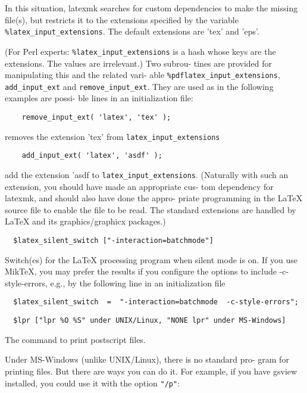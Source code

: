 In this situation, latexmk searches for custom  dependencies  to
make  the  missing  file(s),  but restricts it to the extensions
specified by the variable \verb|%latex_input_extensions|.  The  default
extensions are 'tex' and 'eps'.

(For  Perl experts: \verb|%latex_input_extensions| is a hash whose keys
are the extensions.  The values are  irrelevant.)   Two  subrou-
tines  are  provided for manipulating this and the related vari-
able \verb|%pdflatex_input_extensions|,  \verb|add_input_ext|  
and  \verb|remove_input_ext|.   They are used as in the following examples are possi-
ble lines in an initialization file:

\begin{verbatim}
	remove_input_ext( 'latex', 'tex' );
\end{verbatim}

removes the extension 'tex' from \verb|latex_input_extensions|

\begin{verbatim}
	add_input_ext( 'latex', 'asdf' );
\end{verbatim}

add the extension 'asdf to  \verb|latex_input_extensions|.   (Naturally
with such an extension, you should have made an appropriate cus-
tom dependency for latexmk, and should also have done the appro-
priate  programming  in the LaTeX source file to enable the file
to be read.  The standard extensions are handled  by  LaTeX  and
its graphics/graphicx packages.)

\begin{verbatim}
  $latex_silent_switch ["-interaction=batchmode"]
\end{verbatim}

Switch(es)  for the LaTeX processing program when silent mode is
on.
If you use MikTeX, you may prefer the results if  you  configure
the  options  to include -c-style-errors, e.g., by the following
line in an initialization file

\begin{verbatim}
  $latex_silent_switch  =  "-interaction=batchmode  -c-style-errors";
\end{verbatim}

\begin{verbatim}
  $lpr ["lpr %O %S" under UNIX/Linux, "NONE lpr" under MS-Windows]
\end{verbatim}

The command to print postscript files.

Under  MS-Windows (unlike UNIX/Linux), there is no standard pro-
gram for printing files.  But there are ways you can do it.  For
example, if you have gsview installed, you could use it with the
option \verb|"/p"|:

